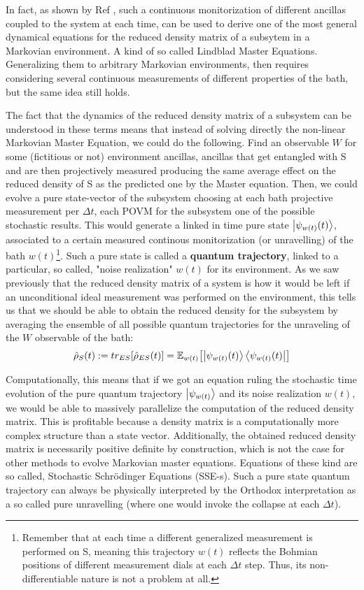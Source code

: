 \documentclass[11pt, a4paper]{article} %
\begin{document}
In fact, as shown by Ref \cite{continousMeas}, such a continuous monitorization of different ancillas coupled to the system at each time, can be used to derive one of the most general dynamical equations for the reduced density matrix of a subsytem in a Markovian environment. A kind of so called Lindblad Master Equations. Generalizing them to arbitrary Markovian environments, then requires considering several continuous measurements of different properties of the bath, but the same idea still holds.

The fact that the dynamics of the reduced density matrix of a subsystem can be understood in these terms means that instead of solving directly the non-linear Markovian Master Equation, we could do the following. Find an observable $W$ for some (fictitious or not) environment ancillas, ancillas that get entangled with S and are then projectively measured producing the same average effect on the reduced density of S as the predicted one by the Master equation. Then, we could evolve a pure state-vector of the subsystem choosing at each bath projective measurement per $\Delta t$, each POVM for the subsystem one of the possible stochastic results. This would generate a linked in time pure state $\ket{\psi_{w(t)}(t)}$, associated to a certain measured continous monitorization (or unravelling) of the bath $w(t)$\footnote{Remember that at each time a different generalized measurement is performed on S, meaning this trajectory $w(t)$ reflects the Bohmian positions of different measurement dials at each $\Delta t$ step. Thus, its non-differentiable nature is not a problem at all.}. Such a pure state is called a {\bf quantum trajectory}, linked to a particular, so called, "noise realization" $w(t)$ for its environment. As we saw previously that the reduced density matrix of a system is how it would be left if an unconditional ideal measurement was performed on the environment, this tells us that we should be able to obtain the reduced density for the subsystem by averaging the ensemble of all possible quantum trajectories for the unraveling of the $W$ observable of the bath:
\begin{equation}
\hat{\rho}_S(t):=tr_{ES}[\hat{\rho}_{ES}(t)]=\mathbb{E}_{w(t)}\qty[\ket{\psi_{w(t)}(t)}\bra{\psi_{w(t)}(t)}]
\end{equation}

Computationally, this means that if we got an equation ruling the stochastic time evolution of the pure quantum trajectory $\ket{\psi_{w(t)}}$ and its noise realization $w(t)$, we would be able to massively parallelize the computation of the reduced density matrix. This is profitable because a density matrix is a computationally more complex structure than a state vector. Additionally, the obtained reduced density matrix is necessarily positive definite by construction, which is not the case for other methods to evolve Markovian master equations. Equations of these kind are so called, Stochastic Schrödinger Equations (SSE-s). Such a pure state quantum trajectory can always be physically interpreted by the Orthodox interpretation as a so called pure unravelling (where one would invoke the collapse at each $\Delta t$).
\end{document}
